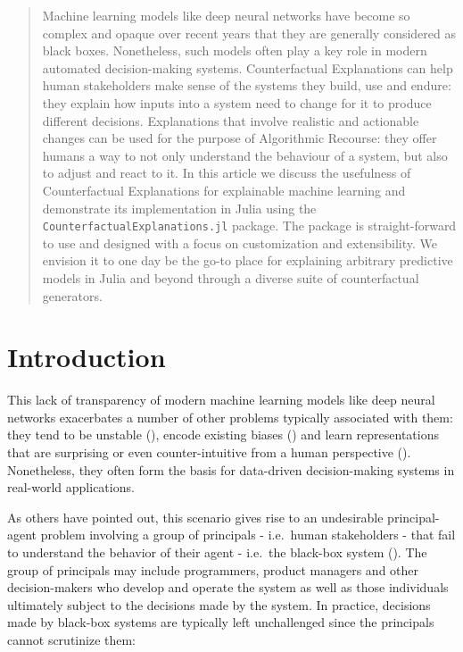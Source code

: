 \documentclass{juliacon}
\begin{document}


\maketitle

\begin{abstract}

Machine learning models like deep neural networks have become so complex and opaque over recent years that they are generally considered as black boxes. Nonetheless, such models often play a key role in modern automated decision-making systems. Counterfactual Explanations can help human stakeholders make sense of the systems they build, use and endure: they explain how inputs into a system need to change for it to produce different decisions. Explanations that involve realistic and actionable changes can be used for the purpose of Algorithmic Recourse: they offer humans a way to not only understand the behaviour of a system, but also to adjust and react to it. In this article we discuss the usefulness of Counterfactual Explanations for explainable machine learning and demonstrate its implementation in Julia using the \verb|CounterfactualExplanations.jl| package. The package is straight-forward to use and designed with a focus on customization and extensibility. We envision it to one day be the go-to place for explaining arbitrary predictive models in Julia and beyond through a diverse suite of counterfactual generators.

\end{abstract}

\hypertarget{sec-intro}{%
\section{Introduction}\label{sec-intro}}

This lack of transparency of modern machine learning models like deep
neural networks exacerbates a number of other problems typically
associated with them: they tend to be unstable
(\cite{goodfellow2014explaining}), encode existing biases
(\cite{buolamwini2018gender}) and learn representations that are
surprising or even counter-intuitive from a human perspective
(\cite{sturm2014simple}). Nonetheless, they often form the basis for
data-driven decision-making systems in real-world applications.

As others have pointed out, this scenario gives rise to an undesirable
principal-agent problem involving a group of principals - i.e.~human
stakeholders - that fail to understand the behavior of their agent -
i.e.~the black-box system (\cite{borch2022machine}). The group of
principals may include programmers, product managers and other
decision-makers who develop and operate the system as well as those
individuals ultimately subject to the decisions made by the system. In
practice, decisions made by black-box systems are typically left
unchallenged since the principals cannot scrutinize them:
\end{document}
